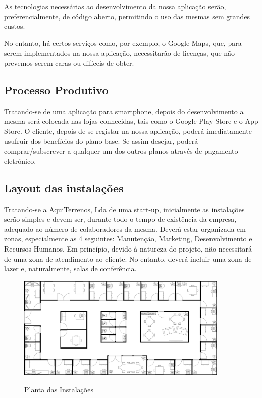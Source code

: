 \documentclass[11pt]{article}
\begin{document}
	As tecnologias necessárias ao desenvolvimento da nossa aplicação serão, preferencialmente, de código aberto, permitindo o uso das mesmas sem grandes custos.
	
	No entanto, há certos serviços como, por exemplo, o Google Maps, que, para serem implementados na nossa aplicação, necessitarão de licenças, que não prevemos serem caras ou difíceis de obter.
	
	
	\large
	\subsection{Processo Produtivo}
	
	\normalsize
	
	Tratando-se de uma aplicação para smartphone, depois do desenvolvimento a mesma será colocada nas lojas conhecidas, tais como o Google Play Store e o App Store. O cliente, depois de se registar na nossa aplicação, poderá imediatamente usufruir dos benefícios do plano base. Se assim desejar, poderá comprar/subscrever a qualquer um dos outros planos através de pagamento eletrónico.
	
	
	\large
	\subsection{Layout das instalações}
	
	\normalsize
	
	Tratando-se a AquiTerrenos, Lda de uma start-up, inicialmente as instalações serão simples e devem ser, durante todo o tempo de existência da empresa, adequado ao número de colaboradores da mesma. Deverá estar organizada em zonas, especialmente as 4 seguintes: Manutenção, Marketing, Desenvolvimento e Recursos Humanos. Em princípio, devido à natureza do projeto, não necessitará de uma zona de atendimento ao cliente. No entanto, deverá incluir uma zona de lazer e, naturalmente, salas de conferência.
	
	\vspace{1cm}
	
	\begin{figure}[h]
		\includegraphics[width=0.9\textwidth,keepaspectratio]{planta}
		\label{fig:planta}
		\centering
		\caption{Planta das Instalações}
	\end{figure}
	
\end{document}
